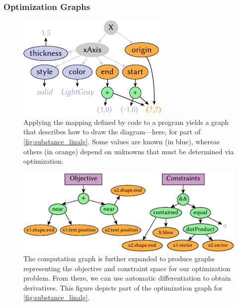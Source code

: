 
\subsubsection{Optimization Graphs}
\label{sec:OptimizationGraphs}

\begin{figure}
   \begin{minipage}[c]{.4\linewidth}
      \vspace{-\baselineskip}\caption{Applying the mapping defined by \Style{} code to a \Substance{} program yields a graph that describes how to draw the diagram---here, for part of \cref{fig:substance_linalg}.  Some values are known (in blue), whereas others (in orange) depend on unknowns that must be determined via optimization.\label{fig:build_computation_graph}}
   \end{minipage}\hfill
   \begin{minipage}[c]{.5\linewidth}
   \includegraphics[scale=1.5]{assets/penrose/build_computation_graph.pdf}
   \end{minipage}
\end{figure}

\begin{figure}[t]
\centering
   \includegraphics[scale=1.5]{assets/penrose/optimization_computation_graph.pdf}
   \caption{The computation graph is further expanded to produce graphs representing the objective and constraint space for our optimization problem. From there, we can use automatic differentiation to obtain derivatives.  This figure depicts part of the optimization graph for \cref{fig:substance_linalg}.\label{fig:optimization_computation_graph}}
 \end{figure}

